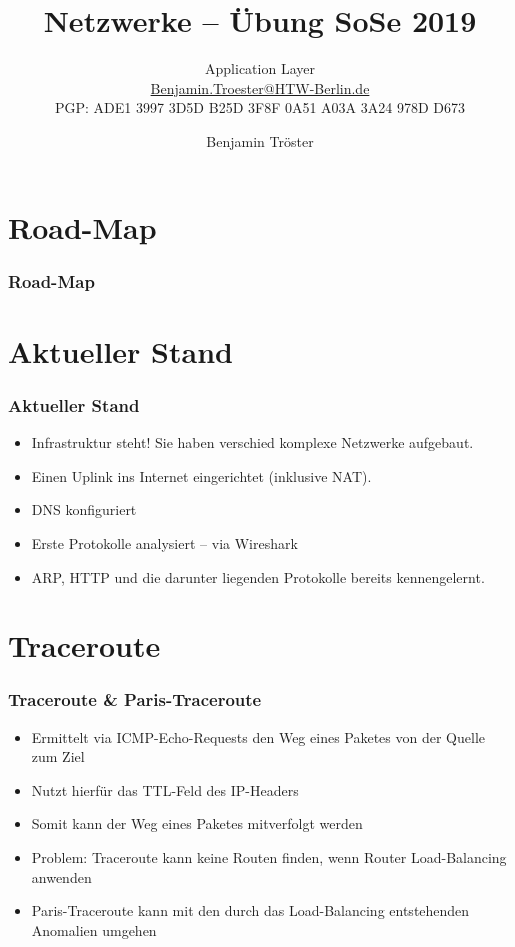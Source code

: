 \documentclass[xcolor=dvipsnames, aspectratio=169]{beamer}
\begin{document}

\title{Netzwerke -- Übung SoSe 2019}
\subtitle{Application Layer\\
		\href{mailto:Benjamin.Troester@HTW-Berlin.de}{Benjamin.Troester@HTW-Berlin.de}\\
		PGP: ADE1 3997 3D5D B25D 3F8F 0A51 A03A 3A24 978D D673 }
\author{Benjamin Tröster}

\date{}

\begin{frame}
\titlepage

\end{frame}

\section*{Road-Map}
\begin{frame}
\frametitle{Road-Map}
\begin{multicols}{2}
  \tableofcontents
\end{multicols}
\end{frame}

\section{Aktueller Stand}
\begin{frame}
	\frametitle{Aktueller Stand}
	\begin{itemize}
		\item Infrastruktur steht! Sie haben verschied komplexe Netzwerke aufgebaut.
		\item Einen Uplink ins Internet eingerichtet (inklusive NAT).
		\item DNS konfiguriert
		\item Erste Protokolle analysiert -- via Wireshark
		\item ARP, HTTP und die darunter liegenden Protokolle bereits kennengelernt.
	\end{itemize}
\end{frame}

\section{Traceroute}
\begin{frame}
	\frametitle{Traceroute \& Paris-Traceroute}
	\begin{itemize}
		\item Ermittelt via ICMP-Echo-Requests den Weg eines Paketes von der Quelle zum Ziel
		\item Nutzt hierfür das TTL-Feld des IP-Headers
		\item Somit kann der Weg eines Paketes mitverfolgt werden
		\item Problem: Traceroute kann keine Routen finden, wenn Router Load-Balancing anwenden
		\item Paris-Traceroute kann mit den durch das Load-Balancing entstehenden Anomalien umgehen    
	\end{itemize}
\end{frame}
\end{document}
